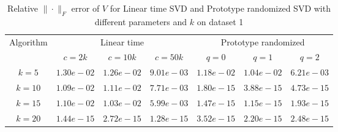 \begin{table}\label{V1}
\centering
\begin{tabular}{|c|c|c|c|c|c|c|}

\hline
\multirow{2}{*}{ Algorithm} &\multicolumn{3}{c|}{Linear time} &\multicolumn{3}{c|}{Prototype randomized}\\\cline{2-7}
 &$c=2k$ &$c=10k$ &$c=50k$ &$q=0$ &$q=1$ &$q=2$\\\hline
$k=5$ & $1.30e-02$ & $1.26e-02$ & $9.01e-03$ & $1.18e-02$ & $1.04e-02$ & $6.21e-03$\\\hline
$k=10$ & $1.09e-02$ & $1.11e-02$ & $7.71e-03$ & $1.80e-15$ & $3.88e-15$ & $4.73e-15$\\\hline
$k=15$ & $1.10e-02$ & $1.03e-02$ & $5.99e-03$ & $1.47e-15$ & $1.15e-15$ & $1.93e-15$\\\hline
$k=20$ & $1.44e-15$ & $2.72e-15$ & $1.28e-15$ & $3.52e-15$ & $2.20e-15$ & $2.48e-15$\\\hline
\end{tabular}
\caption{Relative $\|\cdot\|_F$ error of $V$ for Linear time SVD and Prototype randomized SVD with different parameters and $k$ on dataset 1}
\end{table}
